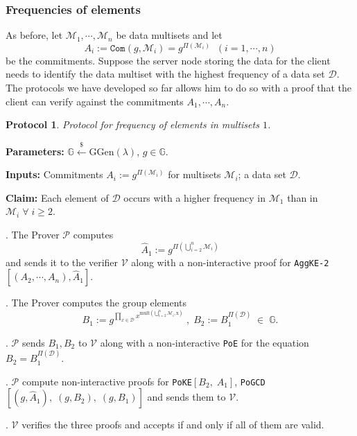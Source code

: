 \documentclass[11pt, lettersize, notitlepage, leqno, footskip=0.6cm]{article}
\newcommand{\pl}{\prod\limits}
\newcommand{\ttt}{\texttt}
\newcommand{\bG}{\mathbb{G}}
\newcommand{\mc}{\mathcal}
\newcommand{\mb}{\mathbb}
\newcommand{\mr}{\mathrm}
\newcommand{\lamb}{\lambda}
\newcommand{\what}{\widehat}
\newcommand{\mP}{\mc{P}}
\newcommand{\V}{\mc{V}}
\newcommand{\vs}{\vspace{-0.15cm}}
\newcommand{\noin}{\noindent}
\newtheorem{Prot}[Thm]{Protocol}
\numberwithin{equation}{section}
\begin{document}
\subsubsection{\fontsize{11}{11} Frequencies of elements}

As before, let $\mc{M}_1,\cdots, \mc{M}_n$ be data multisets and let \vs $$A_i:= \ttt{Com}(g,\mc{M}_i) = g^{\Pi(\mc{M}_i)}\;\;(i=1,\cdots,n) $$ be the commitments. Suppose the server node storing the data for the client needs to identify the data multiset with the highest frequency of a data set $\mc{D}$. The protocols we have developed so far allows him to do so with a proof that the client can verify against the commitments $A_1,\cdots,A_n$.\vspace{0.1cm}

\begin{Prot} Protocol for frequency of elements in multisets $1$.\end{Prot} \vspace{-0.3cm}

\noin \textbf{Parameters:} $\mb{G}\xleftarrow{\$} \mr{GGen}(\lamb)$,\; $g\in \mb{G}$.

\noin \textbf{Inputs:} Commitments $A_i := g^{\Pi(\mc{M}_i)}$ for multisets $\mc{M}_i$; a data set $\mc{D}$.

\noin \textbf{Claim:} Each element of $\mc{D}$ occurs with a higher frequency in $\mc{M}_1$ than in $\mc{M}_i\;\forall\;i\geq 2$.

\begin{prf1}\noin {}. The Prover $\mP$ computes \vs $$\what{A}_1:= g^{\Pi\left(\bigcup\limits_{i=2}^n \mc{M}_i\right)} $$ and sends it to the verifier $\V$ along with a non-interactive proof for \verb|AggKE-2|$[(A_2,\cdots,A_n), \what{A}_1]$.

\noin 2. The Prover computes the group elements \vs $$B_1:= g^{\pl_{x\in \mc{D}} x^{\mr{mult\left(\bigcup\limits_{i=2}^n \mc{M}_i, x\right)}}}\;,\;B_2:= B_1^{\Pi(\mc{D})} \;\in\; \bG.$$

\noin 3. $\mP$ sends $B_1, B_2$ to $\V$ along with a non-interactive \verb|PoE| for the equation $B_2= B_1^{\Pi(\mc{D})}$.

\noin 4. $\mP$ compute non-interactive proofs for \verb|PoKE|$[B_2,\;A_1]$, \verb|PoGCD|$[(g, \what{A}_1),\;(g, B_2),\;(g, B_1)]$ and sends them to $\V$.

\noin 5. $\V$ verifies the three proofs and accepts if and only if all of them are valid.\end{prf1}
\end{document}
